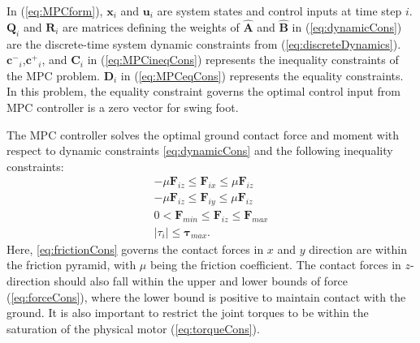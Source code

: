 
In (\ref{eq:MPCform}), $\bm x_i$ and $\bm u_i$ are system states and control inputs at time step $i$.  $\bm Q_i$ and $\bm R_i$ are matrices defining the weights of  $\bm {\hat{A}}$ and $\bm {\hat{B}}$ in (\ref{eq:dynamicCons}) are the discrete-time system dynamic constraints from (\ref{eq:discreteDynamics}). $\bm {c^-}_i$,$\bm {c^+}_i$, and $\bm C_i$ in (\ref{eq:MPCineqCons}) represents the inequality constraints of the MPC problem. $\bm D_i$ in (\ref{eq:MPCeqCons}) represents the equality constraints. In this problem, the equality constraint governs the optimal control input from MPC controller is a zero vector for swing foot. 

The MPC controller solves the optimal ground contact force and moment with respect to dynamic constraints \eqref{eq:dynamicCons} and the following inequality constraints:
\begin{align}
\label{eq:frictionCons}
\nonumber 
-\mu \bm {F}_{iz} \leq \bm F_{ix} \leq \mu \bm {F}_{iz} \\
-\mu \bm {F}_{iz} \leq \bm F_{iy} \leq \mu \bm {F}_{iz} \\
\label{eq:forceCons}
0< \bm {F}_{min} \leq \bm  F_{iz} \leq \bm {F}_{max} \\
\label{eq:torqueCons}
\bm |{\tau}_{i}| \leq \bm {\tau}_{max}. 
\end{align}
Here, \eqref{eq:frictionCons} governs the contact forces in $x$ and $y$ direction are within the friction pyramid, with $\mu$ being the friction coefficient. The contact forces in $z$-direction should also fall within the upper and lower bounds of force (\ref{eq:forceCons}), where the lower bound is positive to maintain contact with the ground. It is also important to restrict the joint torques to be within the saturation of the physical motor (\ref{eq:torqueCons}). 


